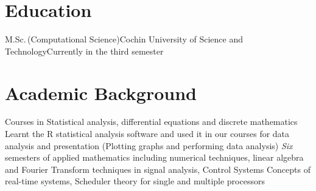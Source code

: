 \documentclass [a4paper,11pt]{moderncv}
\begin{document}
\maketitle
{}

\section{Education}
 {M.Sc.$\,$(Computational Science)}{Cochin University of Science and Technology}{}{\newline{}Currently in the third semester}{}

\section{Academic Background}
 {Courses in Statistical analysis, differential equations and discrete mathematics}
 {Learnt the R statistical analysis software and used it in our courses for data analysis and presentation (Plotting graphs and performing data analysis)}
 {\emph{Six} semesters of applied mathematics including numerical techniques, linear algebra and Fourier Transform techniques in signal analysis, Control Systems}
 {Concepts of real-time systems, Scheduler theory for single and multiple processors}
\end{document}

